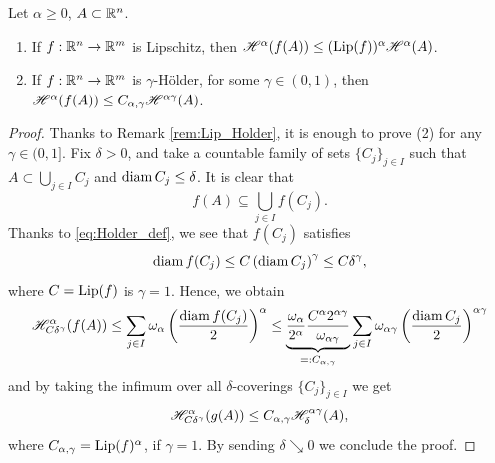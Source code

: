\begin{proposition}
Let $\alpha \geq 0$, $A \subset \mathbb{R}^n$.
\begin{enumerate}[(1)]
\item If $f : \mathbb{R}^n \to \mathbb{R}^m$ is Lipschitz, then $\mathscr{H}^{\alpha}(f(A)) \leq
(\operatorname{Lip}(f))^\alpha \mathscr{H}^{\alpha}(A)$.
\item If $f : \mathbb{R}^n \to \mathbb{R}^m$ is $\gamma$-H\"older, for some $\gamma \in (0, 1)$, then $\mathscr{H}^{\alpha}(f(A)) \leq
C_{\alpha,\gamma} \mathscr{H}^{\alpha \gamma}(A)$.
\end{enumerate}
\end{proposition}

\begin{proof}
Thanks to Remark \ref{rem:Lip_Holder}, it is enough to prove (2) for any $\gamma \in (0, 1]$. Fix $\delta > 0$, and take a countable family of sets $\{C_j\}_{j\in I}$
such that $A \subset \bigcup_{j\in I} C_j$ and $\operatorname{diam} C_j \leq \delta$. It is clear that
$$f(A) \subseteq \bigcup_{j\in I} f(C_j).$$
Thanks to \eqref{eq:Holder_def}, we see that $f(C_j)$ satisfies
\begin{equation*}
\operatorname{diam} f(C_j)\leq C \left(\operatorname{diam} C_j\right)^\gamma \leq C \delta^\gamma,
\end{equation*}
where $C = \operatorname{Lip}(f)$ is $\gamma = 1$.
Hence, we obtain
\[
\begin{aligned}
\mathscr{H}^{\alpha}_{C \delta^\gamma}(f(A)) \leq \sum_{j\in I} \omega_\alpha
\left(\frac{\operatorname{diam} f(C_j)}{2}\right)^\alpha
\leq 
\underbrace{\frac{\omega_\alpha}{2^\alpha} \frac{C^\alpha
2^{\alpha\gamma}}{\omega_{\alpha\gamma}}}_{=: C_{\alpha,\gamma}} \sum_{j\in I} \omega_{\alpha \gamma} 
\left(\frac{\operatorname{diam} C_j}{2}\right)^{\alpha\gamma}
\end{aligned}
\]
and by taking the infimum over all $\delta$-coverings $\{C_j\}_{j\in I}$ we get
\[
\mathscr{H}^{\alpha}_{C\delta^\gamma} (g(A)) \leq C_{\alpha,\gamma}
\mathscr{H}^{\alpha\gamma}_\delta (A),
\]
where $C_{\alpha, \gamma} = \operatorname{Lip}(f)^{\alpha}$, if $\gamma = 1$.
By sending $\delta \searrow 0$ we conclude the proof.
\end{proof}

